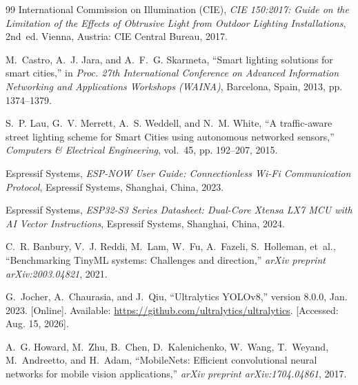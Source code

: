\documentclass[11pt,a4paper]{article}
\begin{document}
\begin{thebibliography}{99}
International Commission on Illumination (CIE), \emph{CIE 150:2017: Guide on the Limitation of the Effects of Obtrusive Light from Outdoor Lighting Installations}, 2nd~ed. Vienna, Austria: CIE Central Bureau, 2017.

M.~Castro, A.~J. Jara, and A.~F.~G. Skarmeta, ``Smart lighting solutions for smart cities,'' in \emph{Proc. 27th International Conference on Advanced Information Networking and Applications Workshops (WAINA)}, Barcelona, Spain, 2013, pp. 1374--1379.

S.~P. Lau, G.~V. Merrett, A.~S. Weddell, and N.~M. White, ``A traffic-aware street lighting scheme for Smart Cities using autonomous networked sensors,'' \emph{Computers \& Electrical Engineering}, vol.~45, pp. 192--207, 2015.

Espressif Systems, \emph{ESP-NOW User Guide: Connectionless Wi-Fi Communication Protocol}, Espressif Systems, Shanghai, China, 2023.

Espressif Systems, \emph{ESP32-S3 Series Datasheet: Dual-Core Xtensa LX7 MCU with AI Vector Instructions}, Espressif Systems, Shanghai, China, 2024.

C.~R. Banbury, V.~J. Reddi, M.~Lam, W.~Fu, A.~Fazeli, S.~Holleman, et~al., ``Benchmarking TinyML systems: Challenges and direction,'' \emph{arXiv preprint arXiv:2003.04821}, 2021.

G.~Jocher, A.~Chaurasia, and J.~Qiu, ``Ultralytics YOLOv8,'' version 8.0.0, Jan. 2023. [Online]. Available: \url{https://github.com/ultralytics/ultralytics}. [Accessed: Aug. 15, 2026].

A.~G. Howard, M.~Zhu, B.~Chen, D.~Kalenichenko, W.~Wang, T.~Weyand, M.~Andreetto, and H.~Adam, ``MobileNets: Efficient convolutional neural networks for mobile vision applications,'' \emph{arXiv preprint arXiv:1704.04861}, 2017.

\end{thebibliography}
\end{document}
